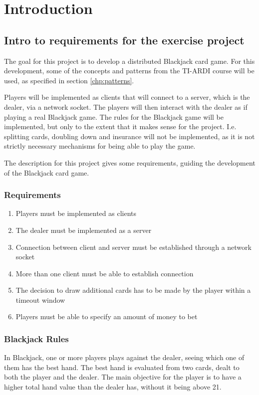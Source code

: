 \chapter{Introduction}
\label{chp:intro}

\section{Intro to requirements for the exercise project}

The goal for this project is to develop a distributed Blackjack card game. For this development, some of the concepts and patterns from the TI-ARDI course will be used, as specified in section \ref{chp:patterns}. 

Players will be implemented as clients that will connect to a server, which is the dealer, via a network socket. The players will then interact with the dealer as if playing a real Blackjack game. The rules for the Blackjack game will be implemented, but only to the extent that it makes sense for the project. I.e. splitting cards, doubling down and insurance will not be implemented, as it is not strictly necessary mechanisms for being able to play the game. 

The description for this project gives some requirements, guiding the development of the Blackjack card game.
\subsection{Requirements}
\begin{enumerate}  
	\item Players must be implemented as clients
	\item The dealer must be implemented as a server
	\item Connection between client and server must be established through a network socket
	\item More than one client must be able to establish connection
	\item The decision to draw additional cards has to be made by the player within a timeout window
	\item Players must be able to specify an amount of money to bet
\end{enumerate}

\subsection{Blackjack Rules}
In Blackjack, one or more players plays against the dealer, seeing which one of them has the best hand. The best hand is evaluated from two cards, dealt to both the player and the dealer. The main objective for the player is to have a higher total hand value than the dealer has, without it being above 21.
 
